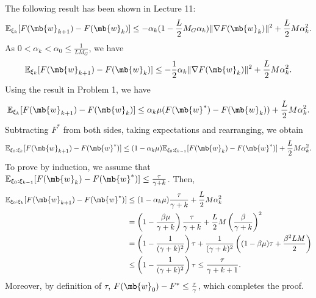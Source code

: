 \begin{exercise}
\begin{enumerate}
            \begin{solution}
                The following result has been shown in Lecture 11:
                \begin{align}\label{eq:SGD-1}
                    \mathbb{E}_{\xi_{k}}[F(\mb{w}_{k+1})-F(\mb{w}_k)] \leq -\alpha_k(1-\frac{L}{2}M_G\alpha_k)\|\nabla F(\mb{w}_k)\|^2 + \frac{L}{2}M\alpha_k^2.
                \end{align}
                As $0 < \alpha_k < \alpha_0\leq\frac{1}{LM_G}$, we have
                \begin{align*}
                    \mathbb{E}_{\xi_{k}}[F(\mb{w}_{k+1})-F(\mb{w}_k)] \leq -\frac{1}{2}\alpha_k\|\nabla F(\mb{w}_k)\|^2 + \frac{L}{2}M\alpha_k^2.
                \end{align*}
                Using the result in Problem 1, we have
                \begin{align*}
                    \mathbb{E}_{\xi_{k}}[F(\mb{w}_{k+1})-F(\mb{w}_k)] \leq \alpha_k\mu(F(\mb{w}^*) - F(\mb{w}_k)) + \frac{L}{2}M\alpha_k^2.
                \end{align*}
                Subtracting $F^*$ from both sides, taking expectations and rearranging, we obtain
                \begin{align*}
                    \mathbb{E}_{\xi_0:\xi_{k}}[F(\mb{w}_{k+1})-F(\mb{w}^*)] \leq (1-\alpha_k\mu)\mathbb{E}_{\xi_0:\xi_{k-1}}[F(\mb{w}_k)-F(\mb{w}^*)] + \frac{L}{2}M\alpha_k^2.
                \end{align*}
                To prove by induction, we assume that $\mathbb{E}_{\xi_0:\xi_{k-1}}[F(\mb{w}_k)-F(\mb{w}^*)] \le \frac{\tau}{\gamma+k}$. Then,
                \begin{align*}
                    \mathbb{E}_{\xi_0:\xi_{k}}[F(\mb{w}_{k+1})-F(\mb{w}^*)] & \le (1-\alpha_k\mu)\frac{\tau}{\gamma+k} + \frac{L}{2}M\alpha_k^2                                                         \\
                                                                            & = \left(1-\frac{\beta\mu}{\gamma+k}\right)\frac{\tau}{\gamma+k} + \frac{L}{2}M\left(\frac{\beta}{\gamma+k}\right)^2       \\
                                                                            & = \left(1-\frac{1}{(\gamma+k)^2}\right)\tau + \frac{1}{(\gamma+k)^2}\left((1 - \beta\mu)\tau + \frac{\beta^2LM}{2}\right) \\
                                                                            & \le \left(1-\frac{1}{(\gamma+k)^2}\right)\tau \le \frac{\tau}{\gamma + k + 1}.
                \end{align*}
                Moreover, by definition of $\tau$, $F(\mb{w}_0) - F^* \le \frac{\tau}{\gamma}$, which completes the proof.
                \qedhere
            \end{solution}


\end{enumerate}
\end{exercise}
